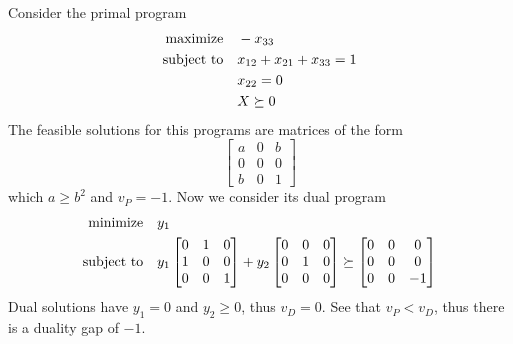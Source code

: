\documentclass[a4paper,twoside,justified]{tufte-handout}
\begin{document}
\begin{example}\label{eg:sdp-duality-gap}
  Consider the primal program 
  \begin{alignat}{2}
    \text{maximize}\hspace{1em}& -x_{33}\\
    \text{subject to}\hspace{1em}& x_{12} + x_{21} + x_{33} = 1\\
    & x_{22}=0\\
    & X \succeq 0
  \end{alignat}
  The feasible solutions for this programs are matrices of the form 
  \begin{equation}
    \begin{bmatrix}
      a & 0 & b\\
      0 & 0 & 0\\
      b & 0 & 1
    \end{bmatrix}
  \end{equation}
 which $ a \geq b^{2} $ and $ v_{P}=-1 $. Now we consider its dual
 program
  \begin{alignat}{2}
    \text{minimize}\hspace{1em}& y_{1}\\
    \text{subject to}\hspace{1em}& y_{1} \begin{bmatrix}
      0 & 1 & 0\\
      1 & 0 & 0\\
      0 & 0 & 1
    \end{bmatrix} + 
    y_{2} \begin{bmatrix}
      0 & 0 & 0\\
      0 & 1 & 0\\
      0 & 0 & 0
    \end{bmatrix} 
    \succeq 
    \begin{bmatrix}
      0 & 0 & 0\\
      0 & 0 & 0\\
      0 & 0 & -1
    \end{bmatrix}
  \end{alignat}
  Dual solutions have $ y_{1}=0 $ and $ y_{2}\geq 0 $, thus $ v_{D}=0
  $. See that $ v_{P} < v_{D} $, thus there is a duality gap of $ -1 $.
\end{example}
\end{document}
